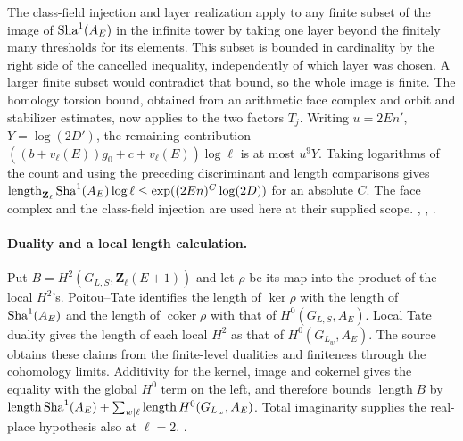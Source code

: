 The class-field injection and layer realization apply to any finite subset of the image of \(\operatorname{Sha}^1(A_E)\) in the infinite tower by taking one layer beyond the finitely many thresholds for its elements. This subset is bounded in cardinality by the right side of the cancelled inequality, independently of which layer was chosen. A larger finite subset would contradict that bound, so the whole image is finite. The homology torsion bound, obtained from an arithmetic face complex and orbit and stabilizer estimates, now applies to the two factors \(T_j\). Writing \(u=2En'\), \(Y=\log(2D')\), the remaining contribution \(((b+v_\ell(E))g_0+c+v_\ell(E))\log\ell\) is at most \(u^9Y\). Taking logarithms of the count and using the preceding discriminant and length comparisons gives \(\operatorname{length}_{\mathbf Z_\ell}\operatorname{Sha}^1(A_E)\log\ell\le \exp((2En)^C\log(2D))\) for an absolute \(C\). The face complex and the class-field injection are used here at their supplied scope.
,
,
.

\paragraph{Duality and a local length calculation.}
Put \(B=H^2(G_{L,S},\mathbf Z_\ell(E+1))\) and let \(\rho\) be its map into the product of the local \(H^2\)'s. Poitou--Tate identifies the length of \(\ker\rho\) with the length of \(\operatorname{Sha}^1(A_E)\) and the length of \(\operatorname{coker}\rho\) with that of \(H^0(G_{L,S},A_E)\). Local Tate duality gives the length of each local \(H^2\) as that of \(H^0(G_{L_w},A_E)\). The source obtains these claims from the finite-level dualities and finiteness through the cohomology limits. Additivity for the kernel, image and cokernel gives the equality with the global \(H^0\) term on the left, and therefore bounds \(\operatorname{length}B\) by \(\operatorname{length}\operatorname{Sha}^1(A_E)+\sum_{w\mid\ell}\operatorname{length}H^0(G_{L_w},A_E)\). Total imaginarity supplies the real-place hypothesis also at \(\ell=2\).
.

